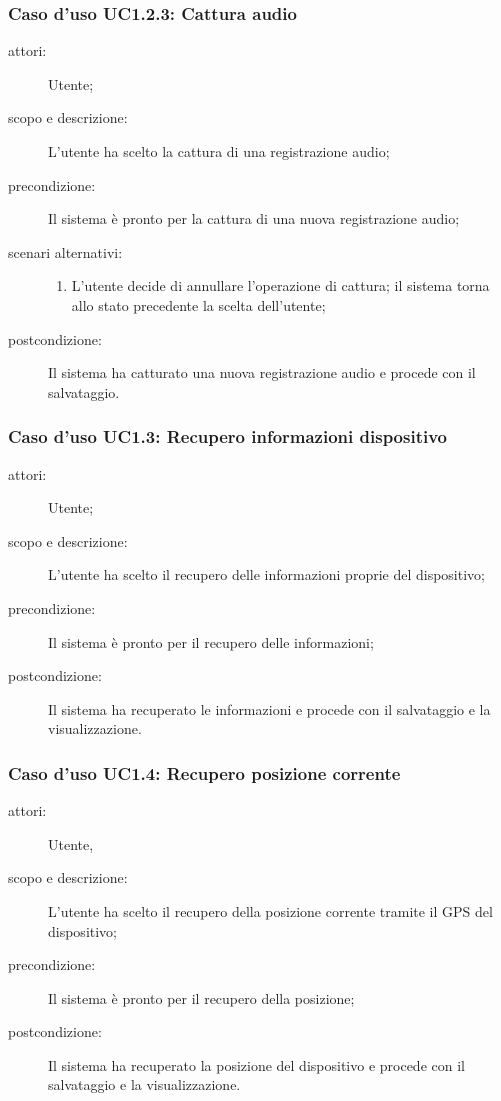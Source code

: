 \subsubsection{Caso d'uso UC1.2.3: Cattura audio}
\begin{description}
\item[attori:] Utente;
\item[scopo e descrizione:] L'utente ha scelto la cattura di una registrazione audio;
\item[precondizione:] Il sistema è pronto per la cattura di una nuova registrazione audio;
\item[scenari alternativi:] \hfill 
	\begin{enumerate}
	\item L'utente decide di annullare l'operazione di cattura; il sistema torna allo stato precedente la scelta dell'utente;
	\end{enumerate}
\item[postcondizione:] Il sistema ha catturato una nuova registrazione audio e procede con il salvataggio.
\end{description}

\subsubsection{Caso d'uso UC1.3: Recupero informazioni dispositivo}
\begin{description}
\item[attori:] Utente;
\item[scopo e descrizione:] L'utente ha scelto il recupero delle informazioni proprie del dispositivo;
\item[precondizione:] Il sistema è pronto per il recupero delle informazioni;
\item[postcondizione:] Il sistema ha recuperato le informazioni e procede con il salvataggio e la visualizzazione.
\end{description}

\subsubsection{Caso d'uso UC1.4: Recupero posizione corrente}
\begin{description}
\item[attori:] Utente,
\item[scopo e descrizione:] L'utente ha scelto il recupero della posizione corrente tramite il \ac{GPS} del dispositivo;
\item[precondizione:] Il sistema è pronto per il recupero della posizione;
\item[postcondizione:] Il sistema ha recuperato la posizione del dispositivo e procede con il salvataggio e la visualizzazione.
\end{description}

